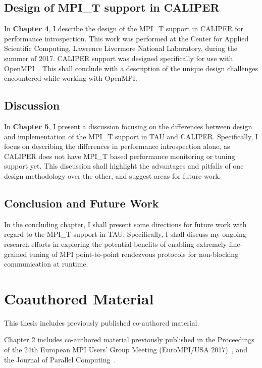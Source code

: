 \subsection {Design of MPI\_T support in CALIPER}
In \textbf{Chapter 4}, I describe the design of the MPI\_T support in CALIPER for performance introspection. This work was performed at the Center for Applied Scientific Computing, Lawrence Livermore National Laboratory, during the summer of 2017. CALIPER support was designed specifically for use with OpenMPI~\cite{OpenMPI}. This shall conclude with a description of the unique design challenges encountered while working with OpenMPI.

\subsection {Discussion}
In \textbf{Chapter 5}, I present a discussion focusing on the differences between design and implementation of the MPI\_T support in TAU and CALIPER. Specifically, I focus on describing the differences in performance introspection alone, as CALIPER does not have MPI\_T based performance monitoring or tuning support yet. This discussion shall highlight the advantages and pitfalls of one design methodology over the other, and suggest areas for future work. 

\subsection {Conclusion and Future Work}
In the concluding chapter, I shall present some directions for future work with regard to the MPI\_T support in TAU. Specifically, I shall discuss my ongoing research efforts in exploring the potential benefits of enabling extremely fine-grained tuning of MPI point-to-point rendezvous protocols for non-blocking communication at runtime.

\section {Coauthored Material}
This thesis includes previously published co-authored material. 
\par Chapter 2 includes co-authored material previously published in the Proceedings of the 24th European MPI Users' Group Meeting (EuroMPI/USA 2017)~\cite{EuroMPI}, and the Journal of Parallel Computing~\cite{ParCo}.
